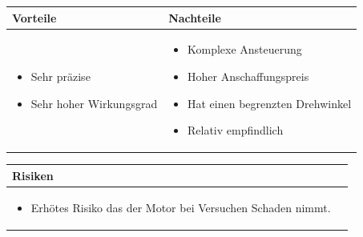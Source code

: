 \begin{table}[h]
\begin{tabular}{p{} | p{}}


 \textbf{Vorteile} & \textbf{Nachteile} \\ \hline
	 
\begin{itemize}
\item Sehr präzise
\item Sehr hoher Wirkungsgrad
\end{itemize}

 
 &
 
\begin{itemize}
\item Komplexe Ansteuerung
\item Hoher Anschaffungspreis
\item Hat einen begrenzten Drehwinkel
\item Relativ empfindlich
\end{itemize}

\end{tabular}
\end{table}

\begin{table}[h]
\begin{tabular}{p{}p{}}


 \textbf{Risiken} & \\ \hline
	 
\begin{itemize}
\item Erhötes Risiko das der Motor bei Versuchen Schaden nimmt.
\end{itemize}

 
\end{tabular}
\end{table}

\pagebreak